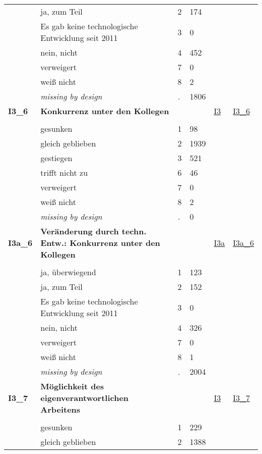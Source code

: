 \begin{longtable}{| L{2.45cm} | L{6cm} | C{1.5cm} | R{1cm} | C{2.25cm} | C{2.25cm} |}
   & ja, zum Teil & 2 & 174 &  &  \\ 
   & Es gab keine technologische Entwicklung seit 2011 & 3 & 0 &  &  \\ 
   & nein, nicht & 4 & 452 &  &  \\ 
   & verweigert & 7 & 0 &  &  \\ 
   & weiß nicht & 8 & 2 &  &  \\ 
   & \textit{missing by design} & \textit{.} & 1806 &  &  \\ 
   \midrule
\textbf{I3\_6}\label{var:I3:6} & \textbf{Konkurrenz unter den Kollegen} &  &  & \hyperref[I3]{I3} & \hyperref[var:suf:I3:6]{I3\_6} \\ 
   &  &  &  &  &  \\ 
   & gesunken & 1 & 98 &  &  \\ 
   & gleich geblieben & 2 & 1939 &  &  \\ 
   & gestiegen & 3 & 521 &  &  \\ 
   & trifft nicht zu & 6 & 46 &  &  \\ 
   & verweigert & 7 & 0 &  &  \\ 
   & weiß nicht & 8 & 2 &  &  \\ 
   & \textit{missing by design} & \textit{.} & 0 &  &  \\ 
   \midrule
\textbf{I3a\_6}\label{var:I3a:6} & \textbf{Veränderung durch techn. Entw.: Konkurrenz unter den Kollegen} &  &  & \hyperref[I3a]{I3a} & \hyperref[var:suf:I3a:6]{I3a\_6} \\ 
   &  &  &  &  &  \\ 
   & ja, überwiegend & 1 & 123 &  &  \\ 
   & ja, zum Teil & 2 & 152 &  &  \\ 
   & Es gab keine technologische Entwicklung seit 2011 & 3 & 0 &  &  \\ 
   & nein, nicht & 4 & 326 &  &  \\ 
   & verweigert & 7 & 0 &  &  \\ 
   & weiß nicht & 8 & 1 &  &  \\ 
   & \textit{missing by design} & \textit{.} & 2004 &  &  \\ 
   \midrule
\textbf{I3\_7}\label{var:I3:7} & \textbf{Möglichkeit des eigenverantwortlichen Arbeitens} &  &  & \hyperref[I3]{I3} & \hyperref[var:suf:I3:7]{I3\_7} \\ 
   &  &  &  &  &  \\ 
   & gesunken & 1 & 229 &  &  \\ 
   & gleich geblieben & 2 & 1388 &  &  \\ 

\end{longtable}
